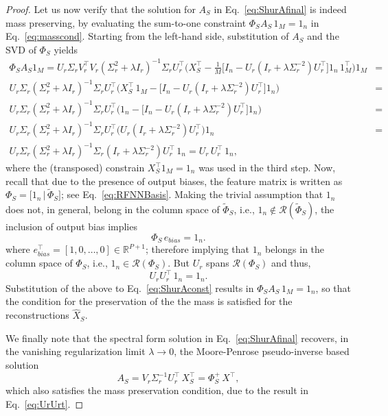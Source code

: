 \documentclass{article}
\begin{document}
\begin{proof}
Let us now verify that the solution for $A_S$ in Eq.~\eqref{eq:ShurAfinal} is indeed mass preserving, by evaluating the sum-to-one constraint $\Phi_S A_S\,1_M=1_n$ in Eq.~\eqref{eq:masscond}. Starting from the left-hand side, substitution of $A_S$ and the SVD of $\Phi_S$ yields
\begin{align}
    \Phi_S A_S1_M = U_r\Sigma_rV_r^{\top }V_r(\Sigma^2_r+\lambda I_r)^{-1}\Sigma_r U^{\top}_r\big(X^{\top}_S-\frac{1}{M}\big[I_n-U_r(I_r + \lambda \Sigma^{-2}_r)U^{\top}_r\big]1_n\,1_M^\top\big)1_M &= \nonumber \\ 
    U_r\Sigma_r(\Sigma^2_r+\lambda I_r)^{-1}\Sigma_r U^{\top}_r\big(X^{\top}_S\, 1_M-\big[I_n-U_r(I_r + \lambda \Sigma^{-2}_r)U^{\top}_r\big]1_n\big) &= \nonumber\\ 
    U_r\Sigma_r(\Sigma^2_r+\lambda I_r)^{-1}\Sigma_r U^{\top}_r\big(1_n-\big[I_n-U_r(I_r + \lambda \Sigma^{-2}_r)U^{\top}_r\big]1_n\big) &= \nonumber \\ 
     U_r\Sigma_r(\Sigma^2_r+\lambda I_r)^{-1}\Sigma_r U^{\top}_r\big(U_r(I_r + \lambda \Sigma^{-2}_r)U^{\top}_r\big)1_n &= \nonumber\\ 
     U_r\Sigma_r(\Sigma^2_r+\lambda I_r)^{-1}\Sigma_r (I_r + \lambda \Sigma^{-2}_r)U^{\top}_r\,1_n=U_r\, U^{\top}_r\,1_n, &
     \label{eq:ShurAconst}
\end{align}
where the (transposed) constrain $X_S^\top 1_M=1_n$ was used in the third step. Now, recall that due to the presence of output biases, the feature matrix is written as $\Phi_S=\big[1_n \, | \, \widetilde{\Phi}_S \big]$; see Eq.~\eqref{eq:RFNNBasis}. Making the trivial assumption that $1_n$ does not, in general, belong in the column space of $\widetilde{\Phi}_S$, i.e., $1_n \notin \mathcal{R}(\widetilde{\Phi}_S)$, the inclusion of output bias implies 
\[\Phi_S \, e_{bias}=1_n.
\] 
where $e_{bias}^\top=[1,0,\ldots,0]\in \mathbb{R}^{P+1}$; therefore implying that $1_n$ belongs in the column space of $\Phi_S$, i.e., $1_n \in \mathcal{R}(\Phi_S)$. But $U_r$ spans $\mathcal{R}(\Phi_S)$ and thus, 
\begin{equation}
U_rU^{\top}_r\,1_n=1_n.
\label{eq:UrUrt}
\end{equation}
Substitution of the above to Eq.~\eqref{eq:ShurAconst} results in $\Phi_S A_S\,1_M=1_n$, so that the condition for the preservation of the the mass is satisfied for the reconstructions $\widehat{X}_S$.

We finally note that the spectral form solution in Eq.~\eqref{eq:ShurAfinal} recovers, in the vanishing regularization limit $\lambda\to0$, the Moore-Penrose pseudo-inverse based solution
\begin{equation}
A_S=V_r\Sigma^{-1}_rU^{\top}_r\,X^{\top}_S=\Phi_S^{+}\, X^{\top},
\end{equation}
which also satisfies the mass preservation condition, due to the result in Eq.~\eqref{eq:UrUrt}.
\end{proof}
\end{document}
